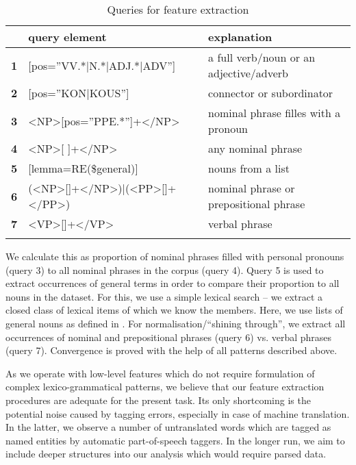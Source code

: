 \documentclass[output=paper]{LSP/langsci}
\begin{document}
\begin{table}
     \centering
     \begin{tabular}{lll}
\lsptoprule
              & \textbf{query element}         & \textbf{explanation} \\ \midrule
\textbf{1}    & [pos=”VV.*|N.*|ADJ.*|ADV”]     & a full verb/noun or an adjective/adverb \\
\textbf{2}    & [pos=”KON|KOUS”]               & connector or subordinator \\
\textbf{3}    & <NP>[pos=”PPE.*”]+</NP>		   & nominal phrase filles with a pronoun \\
\textbf{4}    & <NP>[ ]+</NP>             & any nominal phrase \\ 
\textbf{5}    & [lemma=RE(\$general)]     & nouns from a list   \\ 
\textbf{6}    & (<NP>[]+</NP>)|(<PP>[]+</PP>) & nominal phrase or prepositional phrase \\
\textbf{7}    & <VP>[]+</VP> & verbal phrase\\
\lspbottomrule
     \end{tabular}

 \caption{Queries for feature extraction}
     \label{4.1}
\end{table}

We calculate this as proportion of nominal phrases filled with personal pronouns (query 3) to all nominal phrases in the corpus (query 4). Query 5 is used to extract occurrences of general terms in order to compare their proportion to all nouns in the dataset. For this, we use a simple lexical search – we extract a closed class of lexical items of which we know the members. Here, we use lists of general nouns as defined in \citep{Dipper2012}. For normalisation/“shining through”, we extract all occurrences of nominal and prepositional phrases (query 6) vs. verbal phrases (query 7). Convergence is proved with the help of all patterns described above.

As we operate with low-level features which do not require formulation of complex lexico-grammatical patterns, we believe that our feature extraction procedures are adequate for the present task.  Its only shortcoming is the potential noise caused by tagging errors, especially in case of machine translation. In the latter, we observe a number of untranslated words which are tagged as named entities by automatic part-of-speech taggers.  In the longer run, we aim to include deeper structures into our analysis which would require parsed data.
\end{document}
